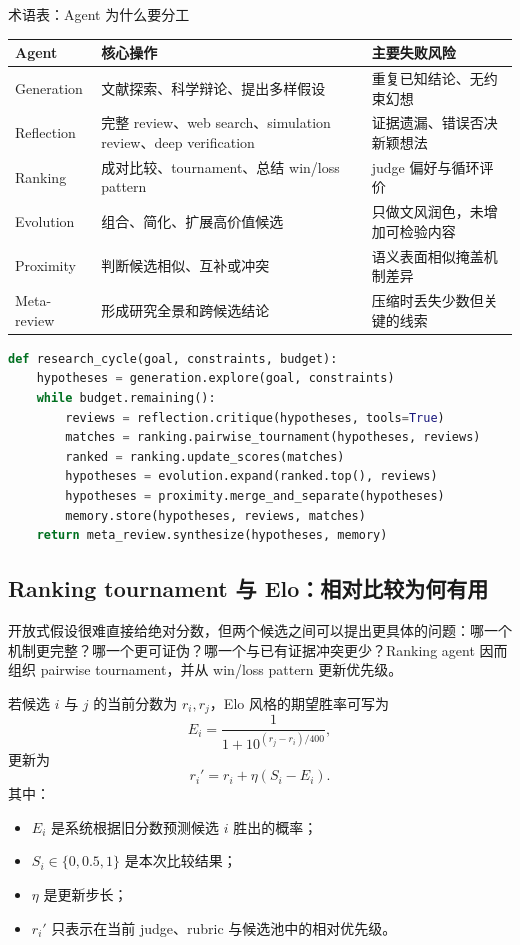 \documentclass[a4paper]{article}
\begin{document}
\begin{knowledgebox}{术语表：Agent 为什么要分工}
\begin{tabular}{L{0.17\textwidth}L{0.33\textwidth}L{0.32\textwidth}}
\toprule
Agent & 核心操作 & 主要失败风险 \\
\midrule
Generation & 文献探索、科学辩论、提出多样假设 & 重复已知结论、无约束幻想 \\
Reflection & 完整 review、web search、simulation review、deep verification & 证据遗漏、错误否决新颖想法 \\
Ranking & 成对比较、tournament、总结 win/loss pattern & judge 偏好与循环评价 \\
Evolution & 组合、简化、扩展高价值候选 & 只做文风润色，未增加可检验内容 \\
Proximity & 判断候选相似、互补或冲突 & 语义表面相似掩盖机制差异 \\
Meta-review & 形成研究全景和跨候选结论 & 压缩时丢失少数但关键的线索 \\
\bottomrule
\end{tabular}
\end{knowledgebox}

\begin{lstlisting}[language=Python,caption={Generate--debate--evolve 的概念性循环}]
def research_cycle(goal, constraints, budget):
    hypotheses = generation.explore(goal, constraints)
    while budget.remaining():
        reviews = reflection.critique(hypotheses, tools=True)
        matches = ranking.pairwise_tournament(hypotheses, reviews)
        ranked = ranking.update_scores(matches)
        hypotheses = evolution.expand(ranked.top(), reviews)
        hypotheses = proximity.merge_and_separate(hypotheses)
        memory.store(hypotheses, reviews, matches)
    return meta_review.synthesize(hypotheses, memory)
\end{lstlisting}

\subsection{Ranking tournament 与 Elo：相对比较为何有用}

开放式假设很难直接给绝对分数，但两个候选之间可以提出更具体的问题：哪一个机制更完整？哪一个更可证伪？哪一个与已有证据冲突更少？Ranking agent 因而组织 pairwise tournament，并从 win/loss pattern 更新优先级。

若候选 $i$ 与 $j$ 的当前分数为 $r_i,r_j$，Elo 风格的期望胜率可写为
$$
E_i=\frac{1}{1+10^{(r_j-r_i)/400}},
$$
更新为
$$
r_i' = r_i + \eta(S_i-E_i).
$$
其中：
\begin{itemize}
  \item $E_i$ 是系统根据旧分数预测候选 $i$ 胜出的概率；
  \item $S_i\in\{0,0.5,1\}$ 是本次比较结果；
  \item $\eta$ 是更新步长；
  \item $r_i'$ 只表示在当前 judge、rubric 与候选池中的相对优先级。
\end{itemize}
\end{document}
